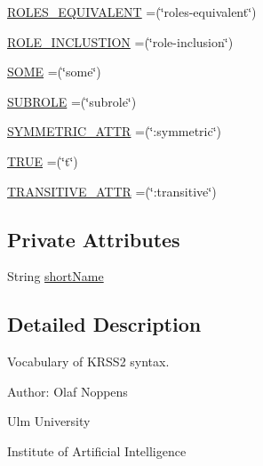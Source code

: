 \begin{DoxyCompactItemize}
\item 
\hyperlink{enumde_1_1uulm_1_1ecs_1_1ai_1_1owlapi_1_1krssrenderer_1_1_k_r_s_s2_vocabulary_a9ea569a1a5aa33b4c937ffa96a671a64}{R\-O\-L\-E\-S\-\_\-\-E\-Q\-U\-I\-V\-A\-L\-E\-N\-T} =(\char`\"{}roles-\/equivalent\char`\"{})
\item 
\hyperlink{enumde_1_1uulm_1_1ecs_1_1ai_1_1owlapi_1_1krssrenderer_1_1_k_r_s_s2_vocabulary_a987ff861b817341a297a8a8783beae72}{R\-O\-L\-E\-\_\-\-I\-N\-C\-L\-U\-S\-T\-I\-O\-N} =(\char`\"{}role-\/inclusion\char`\"{})
\item 
\hyperlink{enumde_1_1uulm_1_1ecs_1_1ai_1_1owlapi_1_1krssrenderer_1_1_k_r_s_s2_vocabulary_a150dfe9090eb388b9a65ea5e9523e5d6}{S\-O\-M\-E} =(\char`\"{}some\char`\"{})
\item 
\hyperlink{enumde_1_1uulm_1_1ecs_1_1ai_1_1owlapi_1_1krssrenderer_1_1_k_r_s_s2_vocabulary_adc140ddbb1bda31a7dbef2f6be144487}{S\-U\-B\-R\-O\-L\-E} =(\char`\"{}subrole\char`\"{})
\item 
\hyperlink{enumde_1_1uulm_1_1ecs_1_1ai_1_1owlapi_1_1krssrenderer_1_1_k_r_s_s2_vocabulary_a47295682051e13c9897fc43522da8e61}{S\-Y\-M\-M\-E\-T\-R\-I\-C\-\_\-\-A\-T\-T\-R} =(\char`\"{}\-:symmetric\char`\"{})
\item 
\hyperlink{enumde_1_1uulm_1_1ecs_1_1ai_1_1owlapi_1_1krssrenderer_1_1_k_r_s_s2_vocabulary_a6abb89318c39d6d95c6eb43e0b468e24}{T\-R\-U\-E} =(\char`\"{}t\char`\"{})
\item 
\hyperlink{enumde_1_1uulm_1_1ecs_1_1ai_1_1owlapi_1_1krssrenderer_1_1_k_r_s_s2_vocabulary_a43c7f7d6144802a77695a54ba1607733}{T\-R\-A\-N\-S\-I\-T\-I\-V\-E\-\_\-\-A\-T\-T\-R} =(\char`\"{}\-:transitive\char`\"{})
\end{DoxyCompactItemize}
\subsection*{Private Attributes}
\begin{DoxyCompactItemize}
\item 
String \hyperlink{enumde_1_1uulm_1_1ecs_1_1ai_1_1owlapi_1_1krssrenderer_1_1_k_r_s_s2_vocabulary_aec51ed30f3d2793b9a750bc6e825405c}{short\-Name}
\end{DoxyCompactItemize}


\subsection{Detailed Description}
Vocabulary of K\-R\-S\-S2 syntax.

Author\-: Olaf Noppens\par
 Ulm University\par
 Institute of Artificial Intelligence\par
 


